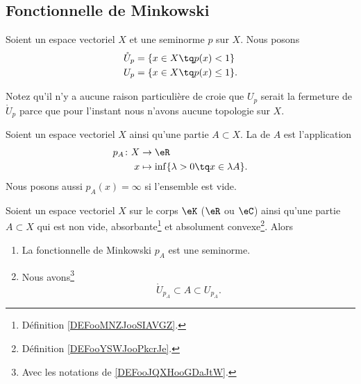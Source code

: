 \subsection{Fonctionnelle de Minkowski}

\begin{definition}		\label{DEFooJQXHooGDaJtW}
	Soient un espace vectoriel \( X\) et une seminorme \( p\) sur \( X\). Nous posons
	\begin{subequations}
		\begin{align}
			\mathring{U}_p & =\{ x\in X\tq p(x)<1 \}      \\
			U_p            & =\{ x\in X\tq p(x)\leq 1 \}.
		\end{align}
	\end{subequations}
\end{definition}

Notez qu'il n'y a aucune raison particulière de croie que \( U_p\) serait la fermeture de \( \mathring{U}_p\) parce que pour l'instant nous n'avons aucune topologie sur \( X\).

\begin{definition}		\label{DEFooYQYBooRkAfjG}
	Soient un espace vectoriel \( X\) ainsi qu'une partie \( A\subset X\). La  de \( A\) est l'application
	\begin{equation}
		\begin{aligned}
			p_A\colon X & \to \eR                                         \\
			x           & \mapsto \inf\{ \lambda >0\tq x\in \lambda A \}.
		\end{aligned}
	\end{equation}
	Nous posons aussi \( p_A(x)=\infty\) si l'ensemble est vide.
\end{definition}

\begin{lemma}		\label{LEMooEIWEooPgoskd}
	Soient un espace vectoriel \( X\) sur le corps \( \eK\) (\( \eR\) ou \( \eC\)) ainsi qu'une partie \( A\subset X\) qui est non vide, absorbante\footnote{Définition \ref{DEFooMNZJooSIAVGZ}.} et absolument convexe\footnote{Définition \ref{DEFooYSWJooPkcrJe}.}. Alors
	\begin{enumerate}
		\item
		      La fonctionnelle de Minkowski \( p_A\) est une seminorme.
		\item
		      Nous avons\footnote{Avec les notations de \ref{DEFooJQXHooGDaJtW}.}
		      \begin{equation}
			      \mathring{U}_{p_A}\subset A\subset U_{p_A}.
		      \end{equation}
	\end{enumerate}
\end{lemma}

